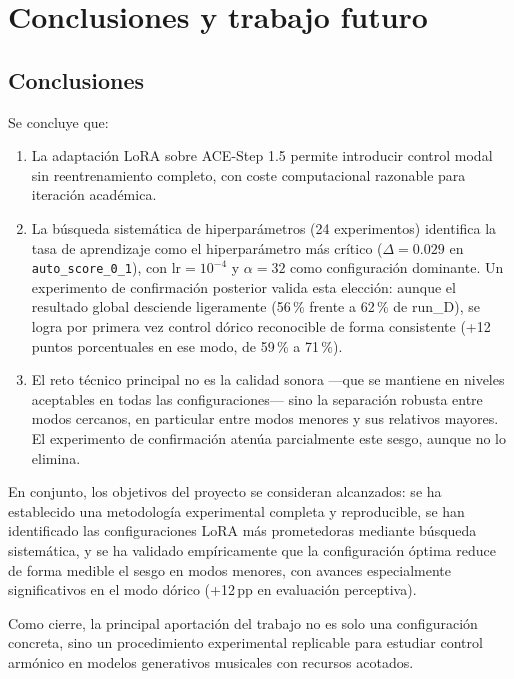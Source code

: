 \documentclass[%
    school=etsisi,%
    type=pfg,%
    degree=61CD,%
]{upm-report}
\begin{document}
\chapter{Conclusiones y trabajo futuro}
\label{ch:conclusiones}

\section{Conclusiones}

Se concluye que:

\begin{enumerate}
    \item La adaptaci\'on LoRA sobre ACE-Step 1.5 permite introducir control modal sin reentrenamiento completo, con coste computacional razonable para iteraci\'on acad\'emica.
    \item La b\'usqueda sistem\'atica de hiperpar\'ametros (24 experimentos) identifica la tasa de aprendizaje como el hiperpar\'ametro m\'as cr\'itico ($\Delta = 0.029$ en \texttt{auto\_score\_0\_1}), con $\text{lr} = 10^{-4}$ y $\alpha = 32$ como configuraci\'on dominante. Un experimento de confirmaci\'on posterior valida esta elecci\'on: aunque el resultado global desciende ligeramente (56\,\% frente a 62\,\% de run\_D), se logra por primera vez control d\'orico reconocible de forma consistente (+12 puntos porcentuales en ese modo, de 59\,\% a 71\,\%).
    \item El reto t\'ecnico principal no es la calidad sonora ---que se mantiene en niveles aceptables en todas las configuraciones--- sino la separaci\'on robusta entre modos cercanos, en particular entre modos menores y sus relativos mayores. El experimento de confirmaci\'on aten\'ua parcialmente este sesgo, aunque no lo elimina.
\end{enumerate}

En conjunto, los objetivos del proyecto se consideran alcanzados: se ha establecido una metodolog\'ia experimental completa y reproducible, se han identificado las configuraciones LoRA m\'as prometedoras mediante b\'usqueda sistem\'atica, y se ha validado emp\'iricamente que la configuraci\'on \'optima reduce de forma medible el sesgo en modos menores, con avances especialmente significativos en el modo d\'orico (+12\,pp en evaluaci\'on perceptiva).

Como cierre, la principal aportaci\'on del trabajo no es solo una configuraci\'on concreta, sino un procedimiento experimental replicable para estudiar control arm\'onico en modelos generativos musicales con recursos acotados.
\end{document}
